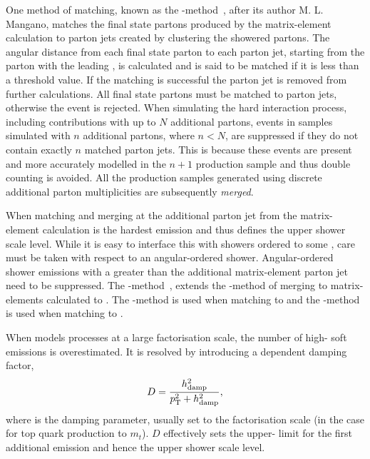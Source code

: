 One method of matching, known as the \MLM{}-method~\cite{Gen:MLM}, after its author M. L. Mangano, matches the final state partons produced by the matrix-element calculation to parton jets created by clustering the showered partons.
The angular distance from each final state parton to each parton jet, starting from the parton with the leading \pt{}, is calculated and is said to be matched if it is less than a threshold value.
If the matching is successful the parton jet is removed from further calculations.
All final state partons must be matched to parton jets, otherwise the event is rejected.
When simulating the hard interaction process, including contributions with up to $N$ additional partons, events in samples simulated with $n$ additional partons, where $n<N$, are suppressed if they do not contain exactly $n$ matched parton jets.
This is because these events are present and more accurately modelled in the $n+1$ production sample and thus double counting is avoided.
All the production samples generated using discrete additional parton multiplicities are subsequently \textit{merged}.

When matching and merging at \NLO{} the additional parton jet from the matrix-element calculation is the hardest emission and thus defines the upper shower scale level.
While it is easy to interface this with showers ordered to some \pt{}, care must be taken with respect to an angular-ordered shower.
Angular-ordered shower emissions with a \pt{} greater than the additional matrix-element parton jet need to be suppressed.
The \FxFx{}-method~\cite{Gen:FXFX}, extends the \MLM{}-method of merging to matrix-elements calculated to \NLO{}.
The \MLM{}-method is used when matching \LO{} \mgamc{} to \pythia{} and the \FxFx{}-method is used when matching \NLO{} \mgamc{} to \pythia{}.

When \powheg{} models processes at a large factorisation scale, the number of high-\pt{} soft emissions is overestimated. 
It is resolved by introducing a \pt{} dependent damping factor, 
\begin{equation*}
	D = \frac{h_{\mathrm{damp}}^2}{p_{\mathrm{T}}^2+h_{\mathrm{damp}}^2},
\end{equation*}
where \hdamp{} is the damping parameter, usually set to the factorisation scale (in the case for top quark production to $m_t$).
$D$ effectively sets the upper-\pt{} limit for the first additional emission and hence the upper shower scale level.


